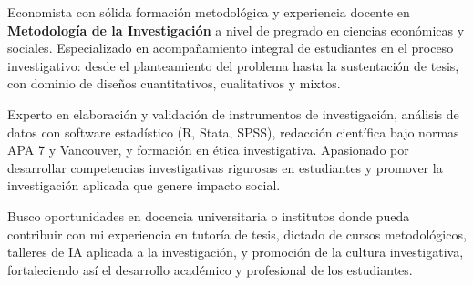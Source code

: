 \par{

	Economista con sólida formación metodológica y experiencia docente en \textbf{Metodología de la Investigación} a nivel de pregrado en ciencias económicas y sociales. Especializado en acompañamiento integral de estudiantes en el proceso investigativo: desde el planteamiento del problema hasta la sustentación de tesis, con dominio de diseños cuantitativos, cualitativos y mixtos.

	Experto en elaboración y validación de instrumentos de investigación, análisis de datos con software estadístico (R, Stata, SPSS), redacción científica bajo normas APA 7 y Vancouver, y formación en ética investigativa. Apasionado por desarrollar competencias investigativas rigurosas en estudiantes y promover la investigación aplicada que genere impacto social.

	Busco oportunidades en docencia universitaria o institutos donde pueda contribuir con mi experiencia en tutoría de tesis, dictado de cursos metodológicos, talleres de IA aplicada a la investigación, y promoción de la cultura investigativa, fortaleciendo así el desarrollo académico y profesional de los estudiantes.





}
